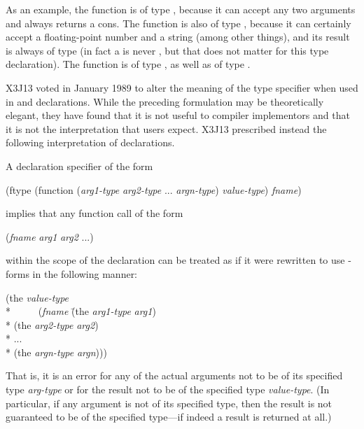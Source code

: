 \begin{flushdesc}
\begin{obsolete}
As an example, the function  is of type ,
because it can accept any two arguments and always returns a cons.
The function  is
also of type , because it can certainly
accept a floating-point number and a string (among other things), and its
result is always of type  (in fact a  is never ,
but that does not matter for this type declaration).
The function  is of type
, as well as of type
.
\end{obsolete}

\begin{new}
X3J13 voted in January 1989
to alter the meaning of the
 type specifier when used in  and 
declarations.  While the preceding formulation may be theoretically
elegant, they have found that it is not useful to compiler implementors
and that it is not the interpretation that users expect.  X3J13 prescribed instead the
following interpretation of declarations.

A declaration specifier of the form
\begin{lisp}
(ftype (function ({\it arg1-type} {\it arg2-type} ... {\it argn-type}) {\it value-type}) {\it fname})
\end{lisp}
implies that any function call of the form
\begin{lisp}
({\it fname} {\it arg1} {\it arg2} ...)
\end{lisp}
within the scope of the declaration can be treated as if it were
rewritten to use -forms in the following manner:
\begin{lisp}
(the {\it value-type} \\*
~~~~~({\it fname} \=(the {\it arg1-type} {\it arg1}) \\*
                  \>(the {\it arg2-type} {\it arg2}) \\*
                  \>... \\*
                  \>(the {\it argn-type} {\it argn})))
\end{lisp}
That is, it is an error for any of the actual arguments not to be of
its specified type {\it arg-type} or for the result not to be of the specified
type {\it value-type}.  (In particular, if any argument is not of
its specified type, then the result is not guaranteed to be of the
specified type---if indeed a result is returned at all.)


\end{new}
\end{flushdesc}

